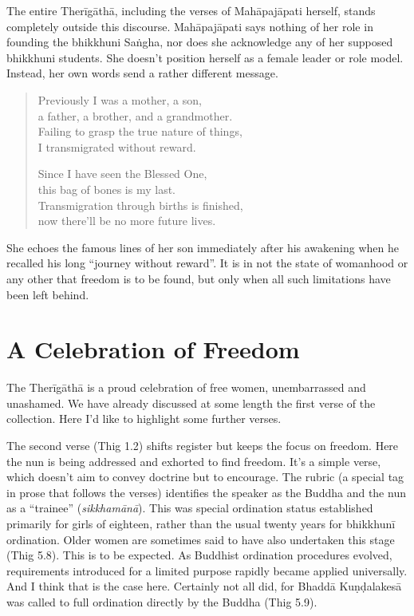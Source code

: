 \documentclass[12pt,openany]{book}%
\begin{document}
The entire \textsanskrit{Therīgāthā}, including the verses of \textsanskrit{Mahāpajāpati} herself, stands completely outside this discourse. \textsanskrit{Mahāpajāpati} says nothing of her role in founding the bhikkhuni \textsanskrit{Saṅgha}, nor does she acknowledge any of her supposed bhikkhuni students. She doesn’t position herself as a female leader or role model. Instead, her own words send a rather different message.

\begin{quotation}%
Previously I was a mother, a son, \\
a father, a brother, and a grandmother. \\
Failing to grasp the true nature of things, \\
I transmigrated without reward.

Since I have seen the Blessed One, \\
this bag of bones is my last. \\
Transmigration through births is finished, \\
now there’ll be no more future lives.

%
\end{quotation}

She echoes the famous lines of her son immediately after his awakening when he recalled his long “journey without reward”. It is in not the state of womanhood or any other that freedom is to be found, but only when all such limitations have been left behind.

\section*{A Celebration of Freedom}

The \textsanskrit{Therīgāthā} is a proud celebration of free women, unembarrassed and unashamed. We have already discussed at some length the first verse of the collection. Here I’d like to highlight some further verses.

The second verse (Thig 1.2) shifts register but keeps the focus on freedom. Here the nun is being addressed and exhorted to find freedom. It’s a simple verse, which doesn’t aim to convey doctrine but to encourage. The rubric (a special tag in prose that follows the verses) identifies the speaker as the Buddha and the nun as a “trainee” (\textit{\textsanskrit{sikkhamānā}}). This was special ordination status established primarily for girls of eighteen, rather than the usual twenty years for \textsanskrit{bhikkhunī} ordination. Older women are sometimes said to have also undertaken this stage (Thig 5.8). This is to be expected. As Buddhist ordination procedures evolved, requirements introduced for a limited purpose rapidly became applied universally. And I think that is the case here. Certainly not all did, for \textsanskrit{Bhaddā} \textsanskrit{Kuṇḍalakesā} was called to full ordination directly by the Buddha (Thig 5.9).
\end{document}
